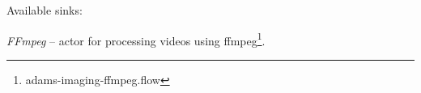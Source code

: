 \documentclass[a4paper]{book}
\begin{document}
\noindent Available sinks:
\begin{tight_itemize}
  \item \textit{FFmpeg} -- actor for processing videos using
  ffmpeg\cite{ffmpeg}\footnote{adams-imaging-ffmpeg.flow}.
\end{tight_itemize}



\end{document}
